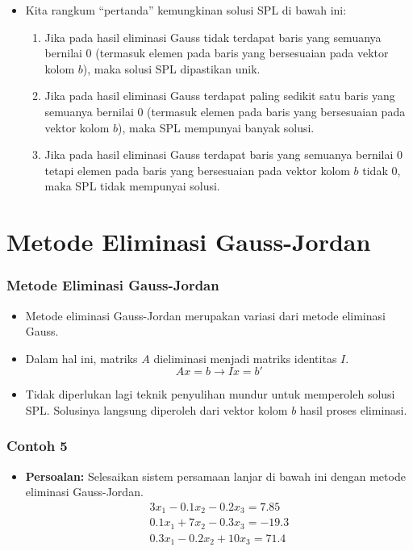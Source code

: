 \documentclass[pdflatex,compress,mathserif]{beamer}
\begin{document}
\begin{frame}
	\begin{itemize}
		\item Kita rangkum “pertanda” kemungkinan solusi SPL di bawah ini:
		\begin{enumerate}
			\item Jika pada hasil eliminasi Gauss tidak terdapat baris yang semuanya bernilai 0 (termasuk elemen pada baris yang bersesuaian pada vektor kolom $ b $), maka solusi SPL dipastikan unik.
			\item Jika pada hasil eliminasi Gauss terdapat paling sedikit satu baris yang semuanya bernilai 0 (termasuk elemen pada baris yang bersesuaian pada vektor kolom $ b $), maka SPL mempunyai banyak solusi.
			\item Jika pada hasil eliminasi Gauss terdapat baris yang semuanya bernilai 0 tetapi elemen pada baris yang bersesuaian pada vektor kolom $ b $ tidak 0, maka SPL tidak mempunyai solusi.
		\end{enumerate}
	\end{itemize}
\end{frame}

\section{Metode Eliminasi Gauss-Jordan}

\begin{frame}
	\frametitle{Metode Eliminasi Gauss-Jordan}
	\begin{itemize}
		\item Metode eliminasi Gauss-Jordan merupakan variasi dari metode eliminasi Gauss.
		\item Dalam hal ini, matriks $ A $ dieliminasi menjadi matriks identitas $ I $.
		\[ Ax = b \rightarrow Ix = b' \]
		\item Tidak diperlukan lagi teknik penyulihan mundur untuk memperoleh solusi SPL. Solusinya langsung diperoleh dari vektor kolom $ b $ hasil proses eliminasi.
	\end{itemize}
\end{frame}

\begin{frame}
	\frametitle{Contoh 5}
	\begin{itemize}
		\item \textbf{Persoalan:} Selesaikan sistem persamaan lanjar di bawah ini dengan metode eliminasi Gauss-Jordan.
		\begin{align*}
		3x_1 - 0.1x_2 - 0.2x_3 = 7.85 \\
		0.1x_1 + 7x_2 - 0.3x_3 = -19.3 \\
		0.3x_1 - 0.2x_2 + 10x_3 = 71.4
		\end{align*}
	\end{itemize}
\end{frame}
\end{document}

